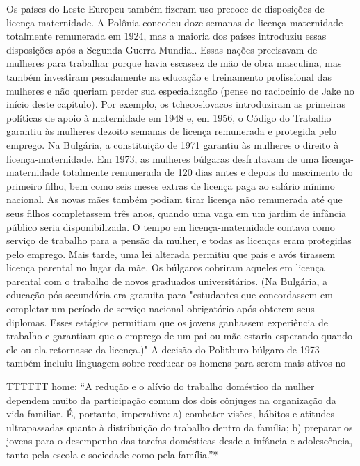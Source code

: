 Os países do Leste Europeu também fizeram uso precoce de disposições de licença-maternidade. A Polônia concedeu doze semanas de licença-maternidade totalmente remunerada em 1924, mas a maioria dos países introduziu essas disposições após a Segunda Guerra Mundial. Essas nações precisavam de mulheres para trabalhar porque havia escassez de mão de obra masculina, mas também investiram pesadamente na educação e treinamento profissional das mulheres e não queriam perder sua especialização (pense no raciocínio de Jake no início deste capítulo). Por exemplo, os tchecoslovacos introduziram as primeiras políticas de apoio à maternidade em 1948 e, em 1956, o Código do Trabalho garantiu às mulheres dezoito semanas de licença remunerada e protegida pelo emprego. Na Bulgária, a constituição de 1971 garantiu às mulheres o direito à licença-maternidade. Em 1973, as mulheres búlgaras desfrutavam de uma licença-maternidade totalmente remunerada de {\color{blue}120} dias antes e depois do nascimento do primeiro filho, bem como seis meses extras de licença paga ao salário mínimo nacional. As novas mães também podiam tirar licença não remunerada até que seus filhos completassem três anos, quando uma vaga em um jardim de infância público seria disponibilizada. O tempo em licença-maternidade contava como serviço de trabalho para a pensão da mulher, e todas as licenças eram protegidas pelo emprego. Mais tarde, uma lei alterada permitiu que pais e avós tirassem licença parental no lugar da mãe. Os búlgaros cobriram aqueles em licença parental com o trabalho de novos graduados universitários. (Na Bulgária, a educação pós-secundária era gratuita para "estudantes que concordassem em completar um período de serviço nacional obrigatório após obterem seus diplomas. Esses estágios permitiam que os jovens ganhassem experiência de trabalho e garantiam que o emprego de um pai ou mãe estaria esperando quando ele ou ela retornasse da licença.)" A decisão do Politburo búlgaro de 1973 também incluiu linguagem sobre reeducar os homens para serem mais ativos no
 \par 
TTTTTT home: “A redução e o alívio do trabalho doméstico da mulher dependem muito da participação comum dos dois cônjuges na organização da vida familiar. É, portanto, imperativo: a) combater visões, hábitos e atitudes ultrapassadas quanto à distribuição do trabalho dentro da família; b) preparar os jovens para o desempenho das tarefas domésticas desde a infância e adolescência, tanto pela escola e sociedade como pela família.”*
 \par 
